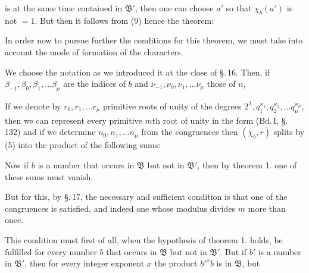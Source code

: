 is at the same time contained in $\mathfrak{B}'$, then one can choose $a'$ so that $\chi_b(a')$ is not $= 1$. But then it follows from (9)
hence the theorem:


In order now to pursue further the conditions for this theorem, we must take into account the mode of formation of the characters.

We choose the notation as we introduced it at the close of \S.\,16. Then, if $\beta_{-1}, \beta_0, \beta_1, \ldots \beta_\mu$ are the indices of $b$ and $\nu_{-1}, \nu_0, \nu_1, \ldots \nu_\mu$ those of $n$,

If we denote by $r_0, r_1, \ldots r_\mu$ primitive roots of unity of the degrees $2^\lambda, q_1^{\varkappa_1}, q_2^{\varkappa_2}, \ldots q_\mu^{\varkappa_\mu}$, then we can represent every primitive $m$th root of unity in the form (Bd.\,I, \S.\,132)
and if we determine $n_0, n_1, \ldots n_\mu$ from the congruences
then $(\chi_b, r)$ splits by (5) into the product of the following sums:

Now if $b$ is a number that occurs in $\mathfrak{B}$ but not in $\mathfrak{B}'$, then by theorem 1. one of these sums must vanish.

But for this, by \S.\,17, the necessary and sufficient condition is that one of the congruences
is satisfied, and indeed one whose modulus divides $m$ more than once.

This condition must first of all, when the hypothesis of theorem 1. holds, be fulfilled for every number $b$ that occurs in $\mathfrak{B}$ but not in $\mathfrak{B}'$. But if $b'$ is a number in $\mathfrak{B}'$, then for every integer exponent $x$ the product $b'^{x} b$ is in $\mathfrak{B}$, but
